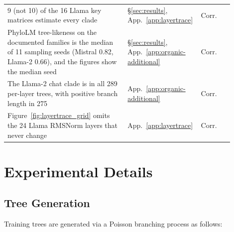 \documentclass{article}
\theoremstyle{definition}
\theoremstyle{plain}
\begin{document}
{\begin{center}
\begin{tabular}{p{0.52\linewidth}p{0.24\linewidth}p{0.14\linewidth}}
9 (not 10) of the 16 Llama key matrices estimate every clade & \S\ref{sec:results}, App.~\ref{app:layertrace} & Corr. \\
PhyloLM tree-likeness on the documented families is the median of 11 sampling seeds (Mistral 0.82, Llama-2 0.66), and the figures show the median seed & \S\ref{sec:results}, App.~\ref{app:organic-additional} & Corr. \\
The Llama-2 chat clade is in all 289 per-layer trees, with positive branch length in 275 & App.~\ref{app:organic-additional} & Corr. \\
Figure~\ref{fig:layertrace_grid} omits the 24 Llama RMSNorm layers that never change & App.~\ref{app:layertrace} & Corr. \\
\bottomrule
\end{tabular}
\end{center}
}
\fi

\section{Experimental Details}
\label{app:details}

\subsection*{Tree Generation}
\label{app:tree-gen}

Training trees are generated via a Poisson branching process as follows:
\end{document}

